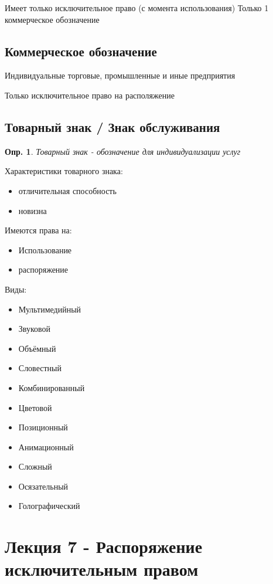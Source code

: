 \documentclass[12pt]{article}
\newtheorem{definition}{Опр.}
\begin{document}
Имеет только исключительное право (с момента использования)
Только 1 коммерческое обозначение

\subsection{Коммерческое обозначение}

Индивидуальные торговые, промышленные и иные предприятия

Только исключительное право на располяжение

\subsection{Товарный знак / Знак обслуживания}

\begin{definition}
  Товарный знак - обозначение для индивидуализации услуг
\end{definition}

Характеристики товарного знака:
\begin{itemize}
  \item отличительная способность
  \item новизна
\end{itemize}

Имеются права на:
\begin{itemize}
  \item Использование
  \item распоряжение
\end{itemize}

Виды:
\begin{itemize}
  \item Мультимедийный
  \item Звуковой
  \item Объёмный
  \item Словестный
  \item Комбинированный
  \item Цветовой
  \item Позиционный
  \item Анимационный
  \item Сложный
  \item Осязательный
  \item Голографический
\end{itemize}

\section{Лекция 7 - Распоряжение исключительным правом}
\end{document}
